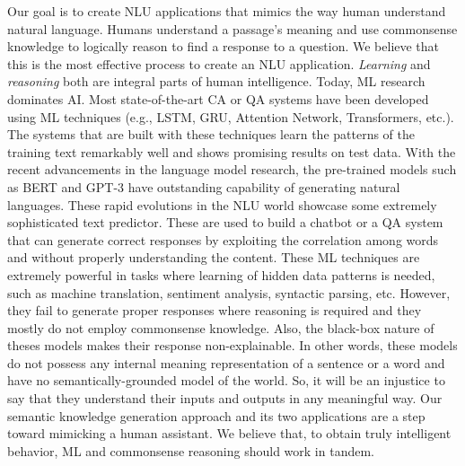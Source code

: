 \documentclass[letterpaper]{article}
\begin{document}

Our goal is to create NLU applications that mimics the way human understand natural language. Humans understand a passage's meaning and use commonsense knowledge to logically reason to find a response to a question. We believe that this is the most effective process to create an NLU application. \textit{Learning} and \textit{reasoning} both are integral parts of human intelligence. Today, ML research dominates AI. Most state-of-the-art CA or QA systems have been developed using ML techniques (e.g., LSTM, GRU, Attention Network, Transformers, etc.). The systems that are built with these  techniques learn the patterns of the training text remarkably well and shows promising results on test data. With the recent advancements in the language model research, the pre-trained models such as BERT \cite{bert} and GPT-3 \cite{gpt3} have outstanding capability of generating natural languages. These rapid evolutions in the NLU world showcase some extremely sophisticated text predictor. These are used to build a chatbot or a QA system that can generate correct responses by exploiting the correlation among words and without properly understanding the content. These ML techniques are extremely powerful in tasks where learning of hidden data patterns is needed, such as machine translation, sentiment analysis, syntactic parsing, etc. However, they fail to generate proper responses where reasoning is required and they mostly do not employ commonsense knowledge. Also, the black-box nature of theses models makes their response non-explainable. In other words, these models do not possess any internal meaning representation of a sentence or a word and have no semantically-grounded model of the world. So, it will be an injustice to say that they understand their inputs and outputs in any meaningful way. Our semantic knowledge generation approach and its two applications are a step toward mimicking a human assistant. We believe that, to obtain truly intelligent behavior, ML and commonsense reasoning should work in tandem.
\end{document}
